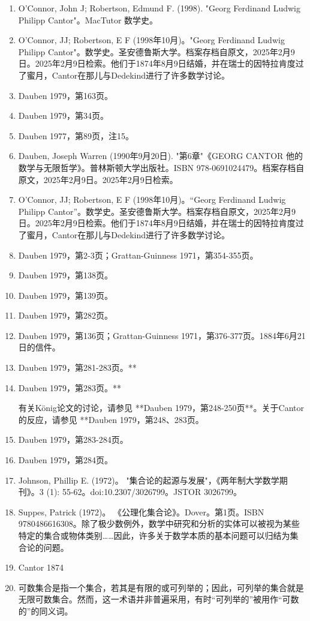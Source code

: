 \begin{enumerate}
\item O'Connor, John J; Robertson, Edmund F. (1998). "Georg Ferdinand Ludwig Philipp Cantor"。MacTutor 数学史。
\item O'Connor, JJ; Robertson, E F (1998年10月)。"Georg Ferdinand Ludwig Philipp Cantor"。数学史。圣安德鲁斯大学。档案存档自原文，2025年2月9日。2025年2月9日检索。他们于1874年8月9日结婚，并在瑞士的因特拉肯度过了蜜月，Cantor在那儿与Dedekind进行了许多数学讨论。
\item Dauben 1979，第163页。
\item Dauben 1979，第34页。
\item Dauben 1977，第89页，注15。
\item Dauben, Joseph Warren (1990年9月20日). "第6章"《GEORG CANTOR 他的数学与无限哲学》。普林斯顿大学出版社。ISBN 978-0691024479。档案存档自原文，2025年2月9日。2025年2月9日检索。
\item O'Connor, JJ; Robertson, E F (1998年10月)。“Georg Ferdinand Ludwig Philipp Cantor”。数学史。圣安德鲁斯大学。档案存档自原文，2025年2月9日。2025年2月9日检索。他们于1874年8月9日结婚，并在瑞士的因特拉肯度过了蜜月，Cantor在那儿与Dedekind进行了许多数学讨论。
\item Dauben 1979，第2-3页；Grattan-Guinness 1971，第354-355页。
\item Dauben 1979，第138页。
\item Dauben 1979，第139页。
\item Dauben 1979，第282页。
\item Dauben 1979，第136页；Grattan-Guinness 1971，第376-377页。1884年6月21日的信件。
\item Dauben 1979，第281-283页。**

\item Dauben 1979，第283页。**

有关König论文的讨论，请参见 **Dauben 1979，第248-250页**。关于Cantor的反应，请参见 **Dauben 1979，第248、283页。
\item Dauben 1979，第283-284页。
\item Dauben 1979，第284页。
\item Johnson, Phillip E. (1972)。 "集合论的起源与发展"，《两年制大学数学期刊》。3 (1): 55-62。doi:10.2307/3026799。JSTOR 3026799。
\item Suppes, Patrick (1972)。 《公理化集合论》。Dover。第1页。ISBN 9780486616308。除了极少数例外，数学中研究和分析的实体可以被视为某些特定的集合或物体类别……因此，许多关于数学本质的基本问题可以归结为集合论的问题。
\item Cantor 1874
\item 可数集合是指一个集合，若其是有限的或可列举的；因此，可列举的集合就是无限可数集合。然而，这一术语并非普遍采用，有时“可列举的”被用作“可数的”的同义词。



\end{enumerate}
